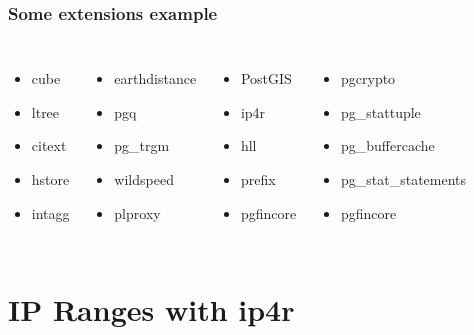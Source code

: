 \documentclass{beamer}
\begin{document}
\begin{frame}[fragile]
  \frametitle{Some extensions example}

  \vfill

\begin{columns}[c]

  \begin{itemize}
   \item cube
   \item \alert{ltree}
   \item citext
   \item \alert{hstore}
   \item \alert{intagg}
  \end{itemize}

  \begin{itemize}
   \item \alert{earthdistance}
   \item pgq
   \item \alert{pg\_trgm}
   \item wildspeed
   \item \alert{plproxy}
  \end{itemize}

  \begin{itemize}
   \item PostGIS
   \item \alert{ip4r}
   \item \alert{hll}
   \item \alert{prefix}
   \item pgfincore
  \end{itemize}

  \begin{itemize}
   \item pgcrypto
   \item pg\_stattuple
   \item pg\_buffercache
   \item pg\_stat\_statements
   \item \alert{pgfincore}
  \end{itemize}

\end{columns}
\end{frame}

\section{IP Ranges with ip4r}
\end{document}
